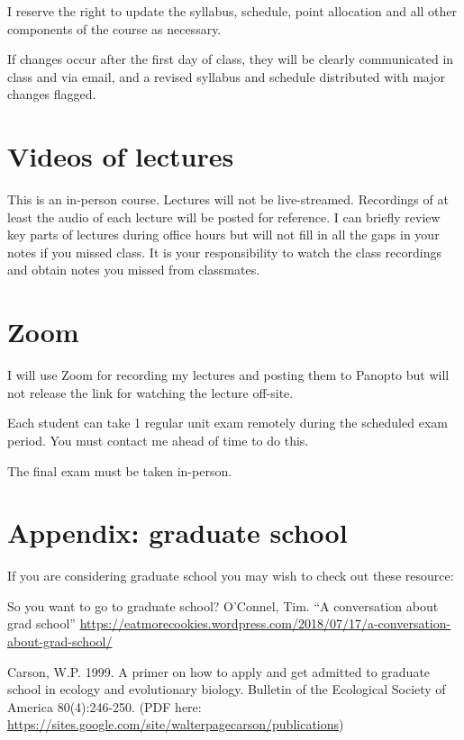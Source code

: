 \documentclass[
]{book}
\begin{document}
I reserve the right to update the syllabus, schedule, point allocation and all other components of the course as necessary.

If changes occur after the first day of class, they will be clearly communicated in class and via email, and a revised syllabus and schedule distributed with major changes flagged.

\hypertarget{videos-of-lectures}{%
\chapter{Videos of lectures}\label{videos-of-lectures}}

This is an in-person course. Lectures will not be live-streamed. Recordings of at least the audio of each lecture will be posted for reference. I can briefly review key parts of lectures during office hours but will not fill in all the gaps in your notes if you missed class. It is your responsibility to watch the class recordings and obtain notes you missed from classmates.

\hypertarget{zoom}{%
\chapter{Zoom}\label{zoom}}

I will use Zoom for recording my lectures and posting them to Panopto but will not release the link for watching the lecture off-site.

Each student can take 1 regular unit exam remotely during the scheduled exam period. You must contact me ahead of time to do this.

The final exam must be taken in-person.

\hypertarget{appendix-graduate-school}{%
\chapter{Appendix: graduate school}\label{appendix-graduate-school}}

If you are considering graduate school you may wish to check out these resource:

So you want to go to graduate school?
O'Connel, Tim. ``A conversation about grad school'' \url{https://eatmorecookies.wordpress.com/2018/07/17/a-conversation-about-grad-school/}

Carson, W.P. 1999. A primer on how to apply and get admitted to graduate school in ecology and evolutionary biology. Bulletin of the Ecological Society of America 80(4):246-250. (PDF here: \url{https://sites.google.com/site/walterpagecarson/publications})
\end{document}
